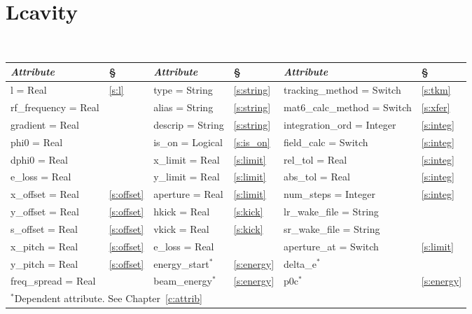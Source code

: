 {{%
\section{Lcavity}
\label{s:lcav}

\begin{center}
\tt
\begin{tabular}{|l|l||l|l||l|l|} \hline
  {\sl Attribute} & \S  & {\sl Attribute} & \S & {\sl Attribute} & \S \\ \hline
  l        = Real       & \ref{s:l}      & type = String     & \ref{s:string} & tracking\_method = Switch   & \ref{s:tkm}   \\ \hline
  rf\_frequency = Real  &                & alias = String    & \ref{s:string} & mat6\_calc\_method = Switch & \ref{s:xfer}  \\ \hline
  gradient      = Real  &                & descrip = String  & \ref{s:string} & integration\_ord = Integer  & \ref{s:integ} \\ \hline
  phi0          = Real  &                & is\_on = Logical  & \ref{s:is_on}  & field\_calc = Switch        & \ref{s:integ} \\ \hline
  dphi0         = Real  &                & x\_limit = Real   & \ref{s:limit}  & rel\_tol = Real             & \ref{s:integ} \\ \hline
  e\_loss    = Real     &                & y\_limit = Real   & \ref{s:limit}  & abs\_tol = Real             & \ref{s:integ} \\ \hline
  x\_offset  = Real     & \ref{s:offset} & aperture = Real   & \ref{s:limit}  & num\_steps = Integer        & \ref{s:integ} \\ \hline
  y\_offset  = Real     & \ref{s:offset} & hkick    = Real   & \ref{s:kick}   & lr\_wake\_file = String     &               \\ \hline
  s\_offset  = Real     & \ref{s:offset} & vkick    = Real   & \ref{s:kick}   & sr\_wake\_file = String     &               \\ \hline
  x\_pitch = Real       & \ref{s:offset} & e\_loss  = Real   &                & aperture\_at = Switch       & \ref{s:limit} \\ \hline
  y\_pitch = Real       & \ref{s:offset} & energy\_start$^*$ & \ref{s:energy} & delta\_e$^*$                &               \\ \hline
  freq\_spread = Real   &                & beam\_energy$^*$  & \ref{s:energy} & p0c$^*$                     & \ref{s:energy}\\ \hline
  \multicolumn{6}{l}{\small $^*$Dependent attribute. See Chapter~\ref{c:attrib}} \\
\end{tabular}
\end{center}
\toffset

}}
